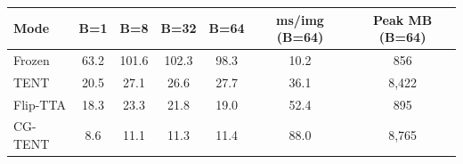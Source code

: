\footnotesize
\setlength{\tabcolsep}{2.5pt}
\begin{tabular}{lcccccc}
\toprule
Mode & B=1 & B=8 & B=32 & B=64 & ms/img (B=64) & Peak MB (B=64) \\
\midrule
Frozen & 63.2 & 101.6 & 102.3 & 98.3 & 10.2 & 856 \\
TENT & 20.5 & 27.1 & 26.6 & 27.7 & 36.1 & 8{,}422 \\
Flip-TTA & 18.3 & 23.3 & 21.8 & 19.0 & 52.4 & 895 \\
CG-TENT & 8.6 & 11.1 & 11.3 & 11.4 & 88.0 & 8{,}765 \\
\bottomrule
\end{tabular}
